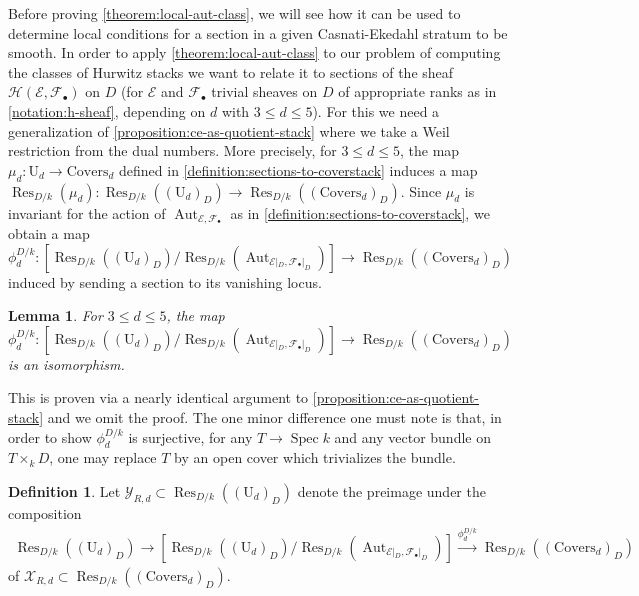 \documentclass[12 pt]{amsart}
\theoremstyle{plain}
\newtheorem{lemma}[theorem]{Lemma}
\theoremstyle{definition}
\newtheorem{definition}[theorem]{Definition}
\theoremstyle{remark}
\numberwithin{equation}{section}
\newcommand\bp{\mathbb P}
\newcommand\sce{\mathscr E}
\newcommand\scf{\mathscr F}
\newcommand\sch{\mathscr H}
\newcommand\scx{\mathscr X}
\newcommand\scy{\mathscr Y}
\DeclareMathOperator\spec{\operatorname{Spec}}
\newcommand\coverstack[1]{\mathrm{Covers}_{d}} %
\newcommand\gorensteinsections[1]{\mathrm{U}_{d}} %
\newcommand\ressections[2]{\scy_{#1,#2}} %
\newcommand\gerbe[2]{\scx_{#1,#2}} %
\DeclareMathOperator\res{Res}
\DeclareMathOperator\aut{Aut}
\begin{document}
Before proving \autoref{theorem:local-aut-class}, we will see how it can be used
to determine local conditions for a section in a given Casnati-Ekedahl stratum
to be smooth.
In order to apply \autoref{theorem:local-aut-class} to our problem of computing
the classes of Hurwitz stacks we want to relate it to sections of the sheaf
$\sch(\sce,\scf_\bullet)$ on $D$ (for $\sce$ and $\scf_\bullet$ trivial sheaves
on $D$ of appropriate ranks as in \autoref{notation:h-sheaf}, depending on $d$ with $3 \leq d \leq 5$).
For this we need a generalization of \autoref{proposition:ce-as-quotient-stack}
where we take a Weil restriction from the dual numbers.
More precisely,
for $3 \leq d \leq 5$,
the map $\mu_d: \gorensteinsections d \to \coverstack d$ 
defined in \autoref{definition:sections-to-coverstack}
induces a map $\res_{D/k}(\mu_d) : \res_{D/k}((\gorensteinsections d)_D) \to
\res_{D/k}((\coverstack d)_D).$
Since $\mu_d$ is invariant for the action of $\aut_{\sce, \scf_\bullet}$
as in \autoref{definition:sections-to-coverstack},
we obtain a map
$\phi_d^{D/k}: [\res_{D/k}((\gorensteinsections d)_D) / \res_{D/k}(\aut_{\sce|_D,
\scf_\bullet|_D})]
\to \res_{D/k}((\coverstack d)_D)$
induced by sending a section to its vanishing locus. 
\begin{lemma} \label{lemma:dual-number-ce-quotient-stack} 
	For $3 \leq d \leq 5$, 
	the map 
	$\phi_d^{D/k}: [\res_{D/k}((\gorensteinsections d)_D) /
	\res_{D/k}(\aut_{\sce|_D, \scf_\bullet|_D})]
\to \res_{D/k}((\coverstack d)_D)$
is an isomorphism.
\end{lemma}
This is proven via a nearly identical argument to
\autoref{proposition:ce-as-quotient-stack} 
and we omit the proof.
The one minor difference one must note is that,
in order to show $\phi_d^{D/k}$ is surjective,
for any $T \to \spec k$ and any vector bundle on $T \times_k D$,
one may replace $T$ by an open cover which trivializes the bundle.

\begin{definition}
	\label{definition:restriction-sections}
Let $\ressections R d \subset \res_{D/k}((\gorensteinsections d)_D)$
denote the preimage under the composition
\begin{align*}
	\res_{D/k}((\gorensteinsections d)_D) \to [\res_{D/k}((\gorensteinsections d)_D) /
	\res_{D/k}(\aut_{\sce|_D, \scf_\bullet|_D})]
	\xrightarrow{\phi_d^{D/k}} \res_{D/k}((\coverstack d)_D)
\end{align*}
	of $\gerbe R d \subset \res_{D/k}((\coverstack d)_D)$.
\end{definition}
\end{document}
